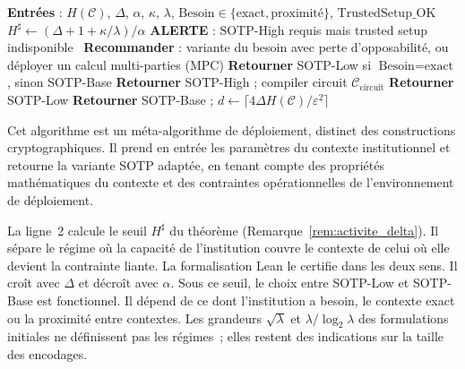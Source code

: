 \begin{sloppypar}
\begin{algorithm}[H]
\caption{S\'election automatique de variante SOTP}
\label{alg:selection_variante_sotp}
\begin{algorithmic}[1]
\State \textbf{Entr\'ees} : $H(\mathcal{C})$, $\Delta$, $\alpha$, $\kappa$, $\lambda$, $\text{Besoin} \in \{\text{exact}, \text{proximit\'e}\}$,
  $\text{TrustedSetup\_OK}$
\State $H^\sharp \leftarrow (\Delta + 1 + \kappa/\lambda)/\alpha$
  \State \textbf{ALERTE} : SOTP-High requis mais trusted setup indisponible~\cite{Bowe2017}
  \State \textbf{Recommander} : variante du besoin avec perte d'opposabilit\'e, ou d\'eployer un calcul multi-parties (MPC)
  \State \textbf{Retourner} SOTP-Low si $\text{Besoin} = \text{exact}$, sinon SOTP-Base
\EndIf
{}
  \State \textbf{Retourner} SOTP-High ;\; compiler circuit $\mathcal{C}_{\text{circuit}}$
  \State \textbf{Retourner} SOTP-Low
\Else
  \State \textbf{Retourner} SOTP-Base ;\; $d \leftarrow \lceil 4\Delta H(\mathcal{C})/\varepsilon^2 \rceil$
\EndIf
\end{algorithmic}
\end{algorithm}

Cet algorithme est un m\'eta-algorithme de d\'eploiement, distinct des
constructions cryptographiques. Il prend en entr\'ee les param\`etres
du contexte institutionnel et retourne la variante SOTP adapt\'ee, en
tenant compte des propri\'et\'es math\'ematiques du contexte
et des contraintes op\'erationnelles de l'environnement de
d\'eploiement.

La ligne~2 calcule le seuil $H^\sharp$ du th\'eor\`eme (Remarque~\ref{rem:activite_delta}). Il
s\'epare le r\'egime o\`u la capacit\'e de l'institution couvre le contexte de celui o\`u elle devient
la contrainte liante. La formalisation Lean le certifie dans les deux sens. Il cro\^it avec
$\Delta$ et d\'ecro\^it avec $\alpha$. Sous ce seuil, le choix entre SOTP-Low et SOTP-Base est
fonctionnel. Il d\'epend de ce dont l'institution a besoin, le contexte exact ou la proximit\'e entre
contextes. Les grandeurs $\sqrt{\lambda}$ et $\lambda/\log_2\lambda$ des formulations initiales ne
d\'efinissent pas les r\'egimes~;
elles restent des indications sur la taille des encodages.


\end{sloppypar}
